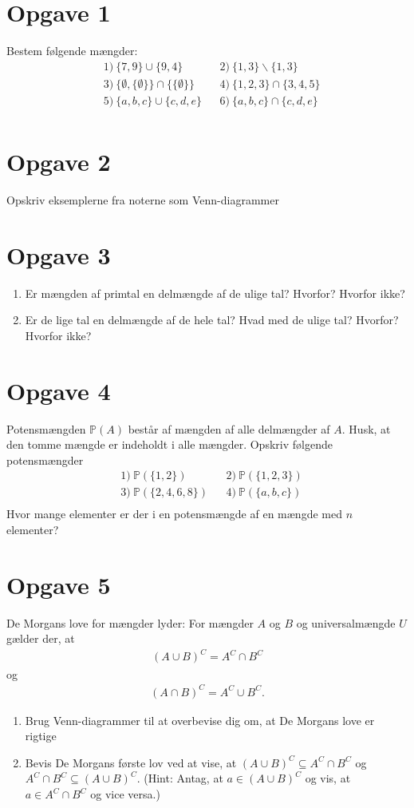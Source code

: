 \section*{Opgave 1}
Bestem følgende mængder:
\begin{align*}
&1) \ \{7,9\} \cup \{9,4\}  &&2) \ \{1,3\} \backslash \{1,3\}    \\
&3) \ \{\emptyset, \{\emptyset\}\} \cap \{\{\emptyset\}\}  &&4) \ \{1,2,3\} \cap \{3,4,5\}  \\
&5) \ \{a,b,c\} \cup \{c,d,e\}  &&6) \ \{a,b,c\} \cap \{c,d,e\}   \\
\end{align*}
\section*{Opgave 2}
Opskriv eksemplerne fra noterne som Venn-diagrammer
\section*{Opgave 3}
\begin{enumerate}[label=\roman*)]
\item Er mængden af primtal en delmængde af de ulige tal? Hvorfor? Hvorfor ikke?
\item Er de lige tal en delmængde af de hele tal? Hvad med de ulige tal? Hvorfor? Hvorfor ikke?
\end{enumerate}
\section*{Opgave 4}
Potensmængden $\mathbb{P}(A)$ består af mængden af alle delmængder af $A$. Husk, at den tomme mængde er indeholdt i alle mængder. Opskriv følgende potensmængder
\begin{align*}
&1) \ \mathbb{P}(\{1,2\})    &&2) \  \mathbb{P}(\{1,2,3\})  \\
&3) \ \mathbb{P}(\{2,4,6,8\})   &&4) \ \mathbb{P}(\{a,b,c\}) \\    
\end{align*}
Hvor mange elementer er der i en potensmængde af en mængde med $n$ elementer?
\section*{Opgave 5}
De Morgans love for mængder lyder: For mængder $A$ og $B$ og universalmængde $U$ gælder der, at
\begin{align*}
(A\cup B)^C = A^C \cap B^C
\end{align*} og
\begin{align*}
(A \cap B)^C = A^C \cup B^C.
\end{align*}
\begin{enumerate}[label=\roman*)]
\item Brug Venn-diagrammer til at overbevise dig om, at De Morgans love er rigtige
\item Bevis De Morgans første lov ved at vise, at $(A\cup B)^C \subseteq A^C \cap B^C$ og $ A^C \cap B^C \subseteq (A\cup B)^C$. (Hint: Antag, at $a \in (A\cup B)^C$ og vis, at $a \in A^C \cap B^C $ og vice versa.)
\end{enumerate}

